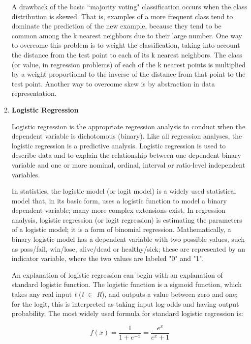 \documentclass{article}
\begin{document}
\begin{enumerate}
	A drawback of the basic ``majority voting" classification occurs when the class distribution is skewed. That is, examples of a more frequent class tend to dominate the prediction of the new example, because they tend to be common among the k nearest neighbors due to their large number. One way to overcome this problem is to weight the classification, taking into account the distance from the test point to each of its k nearest neighbors. The class (or value, in regression problems) of each of the k nearest points is multiplied by a weight proportional to the inverse of the distance from that point to the test point. Another way to overcome skew is by abstraction in data representation.
	\vspace{10px}
	\large \item \textbf{Logistic Regression}
	\normalsize 
	\par Logistic regression is the appropriate regression analysis to conduct when the dependent variable is dichotomous (binary).  Like all regression analyses, the logistic regression is a predictive analysis.  Logistic regression is used to describe data and to explain the relationship between one dependent binary variable and one or more nominal, ordinal, interval or ratio-level independent variables.
	\par In statistics, the logistic model (or logit model) is a widely used statistical model that, in its basic form, uses a logistic function to model a binary dependent variable; many more complex extensions exist. In regression analysis, logistic regression (or logit regression) is estimating the parameters of a logistic model; it is a form of binomial regression. Mathematically, a binary logistic model has a dependent variable with two possible values, such as pass/fail, win/lose, alive/dead or healthy/sick; these are represented by an indicator variable, where the two values are labeled "0" and "1".	
	\par An explanation of logistic regression can begin with an explanation of standard logistic function. The logistic function is a sigmoid function, which takes any real input \textit{t} (\textit{t} $\in$ \textit{R}), and outputs a value between zero and one; for the logit, this is interpreted as taking input log-odds and having output probability. The most widely used formula for standard logistic regression is:
	
	\[f(x) = \frac{1}{1 + e^{-x}} = \frac{e^{x}}{e^{x} + 1}\]
	

\end{enumerate}
\end{document}
